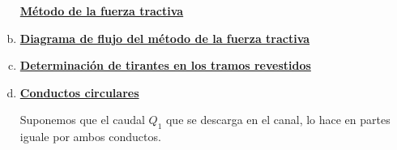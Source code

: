 \documentclass[10.5pt]{article}
\begin{document}
\begin{enumerate}[a)]
  \underline{\bf Método de la fuerza tractiva}
  
  
  
  
 
 \item \underline{\bf Diagrama de flujo del método de la fuerza tractiva}
   
   
 \item \underline{\bf Determinación de tirantes en los tramos revestidos}

   
   
   
 \item \underline{\bf Conductos circulares}
 
 Suponemos que el caudal $Q_1$ que se descarga en el canal, lo hace en partes iguale por ambos conductos.
 
 

\end{enumerate}


























 
\end{document}
